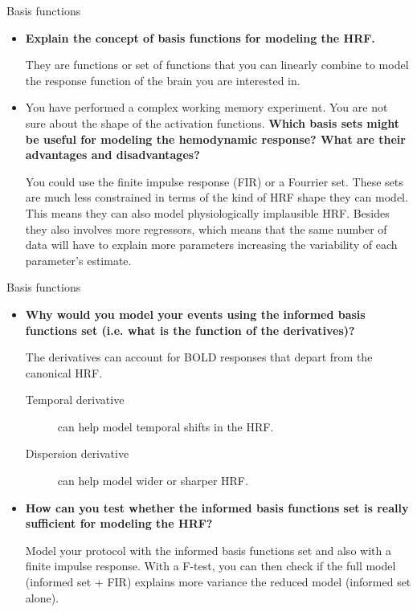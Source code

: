 \documentclass{beamer}
\begin{document}
\begin{frame}{Basis functions}
  \begin{itemize}
    \item \textbf{Explain the concept of basis functions for modeling the HRF.}

\smallskip    
They are functions or set of functions that you can linearly combine to model the response function of the brain you are interested in.

\bigskip
    \item You have performed a complex working memory experiment. You are not sure about the shape of the activation functions. \textbf{Which basis sets might be useful for modeling the hemodynamic response? What are their advantages and disadvantages?}

\smallskip    
You could use the finite impulse response (FIR) or a Fourrier set. These sets are much less constrained in terms of the kind of HRF shape they can model. \linebreak
This means they can also model physiologically implausible HRF. Besides they also involves more regressors, which means that the same number of data will have to explain more parameters increasing the variability of each parameter's estimate. 
  \end{itemize}  
\end{frame}


\begin{frame}{Basis functions}
  \begin{itemize}
    \item \textbf{Why would you model your events using the informed basis functions set (i.e. what is the function of the derivatives)?}

\smallskip     
The derivatives can account for BOLD responses that depart from the canonical HRF.
      \begin{description}
       \item [Temporal derivative] can help model temporal shifts in the HRF.
       \item [Dispersion derivative] can help model wider or sharper HRF.
      \end{description}

\bigskip       
    \item \textbf{How can you test whether the informed basis functions set is really sufficient for modeling the HRF?}

\smallskip     
Model your protocol with the informed basis functions set and also with a finite impulse response. With a F-test, you can then check if the full model (informed set + FIR) explains more variance the reduced model (informed set alone).
  \end{itemize}
\end{frame}
\end{document}

